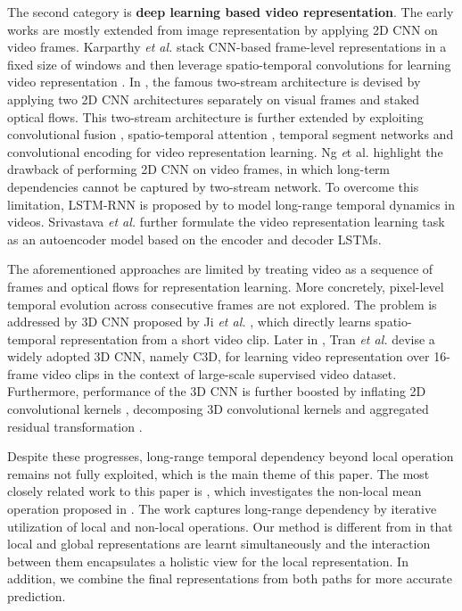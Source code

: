 \documentclass[10pt,twocolumn,letterpaper]{article}
\begin{document}
The second category is \textbf{deep learning based video representation}. The early works are mostly extended from image representation by applying 2D CNN on video frames. Karparthy \emph{et al.} stack CNN-based frame-level representations in a fixed size of windows and then leverage spatio-temporal convolutions for learning video representation \cite{karpathy2014large}. In \cite{simonyan2014two}, the famous two-stream architecture is devised by applying two 2D CNN architectures separately on visual frames and staked optical flows. This two-stream architecture is further extended by exploiting convolutional fusion \cite{feichtenhofer2016convolutional}, spatio-temporal attention \cite{li2018unified}, temporal segment networks \cite{wang2016temporal,wang2018temporal} and convolutional encoding \cite{diba2017deep,qiu2017deep} for video representation learning. Ng \emph et al. \cite{yue2015beyond} highlight the drawback of performing 2D CNN on video frames, in which long-term dependencies cannot be captured by two-stream network. To overcome this limitation, LSTM-RNN is proposed by \cite{yue2015beyond} to model long-range temporal dynamics in videos. Srivastava \emph{et al.} \cite{srivastava2015unsupervised} further formulate the video representation learning task as an autoencoder model based on the encoder and decoder LSTMs.

The aforementioned approaches are limited by treating video as a sequence of frames and optical flows for representation learning. More concretely, pixel-level temporal evolution across consecutive frames are not explored. The problem is addressed by 3D CNN proposed by Ji \emph{et al.} \cite{ji20133d}, which directly learns spatio-temporal representation from a short video clip. Later in \cite{tran2015learning}, Tran \emph{et al.} devise a widely adopted 3D CNN, namely C3D, for learning video representation over 16-frame video clips in the context of large-scale supervised video dataset. Furthermore, performance of the 3D CNN is further boosted by inflating 2D convolutional kernels \cite{carreira2017quo}, decomposing 3D convolutional kernels \cite{qiu2017learning,tran2018closer} and aggregated residual transformation \cite{hara2018can}.

Despite these progresses, long-range temporal dependency beyond local operation remains not fully exploited, which is the main theme of this paper. The most closely related work to this paper is \cite{wang2018non}, which investigates the non-local mean operation proposed in \cite{buades2005non}. The work captures long-range dependency by iterative utilization of local and non-local operations. Our method is different from \cite{wang2018non} in that local and global representations are learnt simultaneously and the interaction between them encapsulates a holistic view for the local representation. In addition, we combine the final representations from both paths for more accurate prediction.
\end{document}
